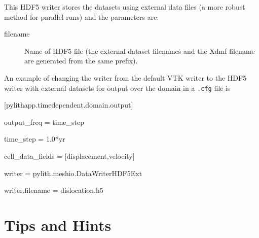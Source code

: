 This HDF5 writer stores the datasets using external data files (a
more robust method for parallel runs) and the parameters are:
\begin{description}
\item [{filename}] Name of HDF5 file (the external dataset filenames and
the Xdmf filename are generated from the same prefix).
\end{description}
An example of changing the writer from the default VTK writer to the
HDF5 writer with external datasets for output over the domain in a
\texttt{.cfg} file is
\begin{lyxcode}
{[}pylithapp.timedependent.domain.output{]}

output\_freq = time\_step

time\_step = 1.0{*}yr

cell\_data\_fields = {[}displacement,velocity{]}

writer = pylith.meshio.DataWriterHDF5Ext

writer.filename = dislocation.h5
\end{lyxcode}

\section{Tips and Hints\label{sec:Tips:Hints}}



